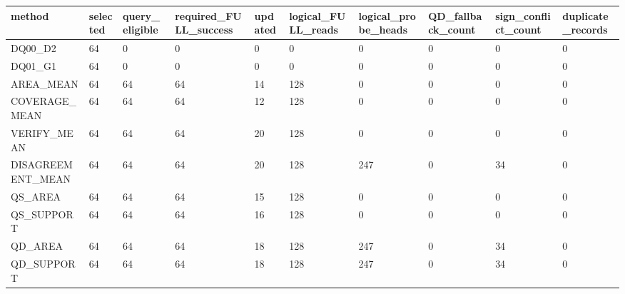 \begin{tabular}{llllllllll}
\toprule
method & selected & query\_eligible & required\_FULL\_success & updated & logical\_FULL\_reads & logical\_probe\_heads & QD\_fallback\_count & sign\_conflict\_count & duplicate\_records \\
\midrule
DQ00\_D2 & 64 & 0 & 0 & 0 & 0 & 0 & 0 & 0 & 0 \\
DQ01\_G1 & 64 & 0 & 0 & 0 & 0 & 0 & 0 & 0 & 0 \\
AREA\_MEAN & 64 & 64 & 64 & 14 & 128 & 0 & 0 & 0 & 0 \\
COVERAGE\_MEAN & 64 & 64 & 64 & 12 & 128 & 0 & 0 & 0 & 0 \\
VERIFY\_MEAN & 64 & 64 & 64 & 20 & 128 & 0 & 0 & 0 & 0 \\
DISAGREEMENT\_MEAN & 64 & 64 & 64 & 20 & 128 & 247 & 0 & 34 & 0 \\
QS\_AREA & 64 & 64 & 64 & 15 & 128 & 0 & 0 & 0 & 0 \\
QS\_SUPPORT & 64 & 64 & 64 & 16 & 128 & 0 & 0 & 0 & 0 \\
QD\_AREA & 64 & 64 & 64 & 18 & 128 & 247 & 0 & 34 & 0 \\
QD\_SUPPORT & 64 & 64 & 64 & 18 & 128 & 247 & 0 & 34 & 0 \\
\bottomrule
\end{tabular}
